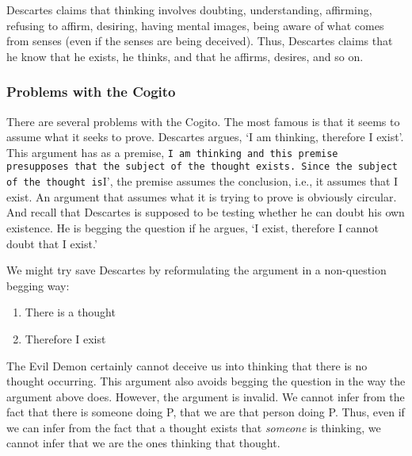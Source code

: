 \documentclass[]{article}
\begin{document}
Descartes claims that thinking involves doubting, understanding,
affirming, refusing to affirm, desiring, having mental images, being
aware of what comes from senses (even if the senses are being deceived).
Thus, Descartes claims that he know that he exists, he thinks, and that
he affirms, desires, and so on.

\subsubsection{Problems with the Cogito}\label{problems-with-the-cogito}

There are several problems with the Cogito. The most famous is that it
seems to assume what it seeks to prove. Descartes argues, `I am
thinking, therefore I exist'. This argument has as a premise,
\texttt{I am thinking\textquotesingle{} and this premise presupposes that the subject of the thought exists. Since the subject of the thought is}I',
the premise assumes the conclusion, i.e., it assumes that I exist. An
argument that assumes what it is trying to prove is obviously circular.
And recall that Descartes is supposed to be testing whether he can doubt
his own existence. He is begging the question if he argues, `I exist,
therefore I cannot doubt that I exist.'

We might try save Descartes by reformulating the argument in a
non-question begging way:

\begin{enumerate}
\def\labelenumi{\arabic{enumi}.}
\itemsep1pt\parskip0pt
\item
  There is a thought
\item
  Therefore I exist
\end{enumerate}

The Evil Demon certainly cannot deceive us into thinking that there is
no thought occurring. This argument also avoids begging the question in
the way the argument above does. However, the argument is invalid. We
cannot infer from the fact that there is someone doing P, that we are
that person doing P. Thus, even if we can infer from the fact that a
thought exists that \emph{someone} is thinking, we cannot infer that we
are the ones thinking that thought.
\end{document}
